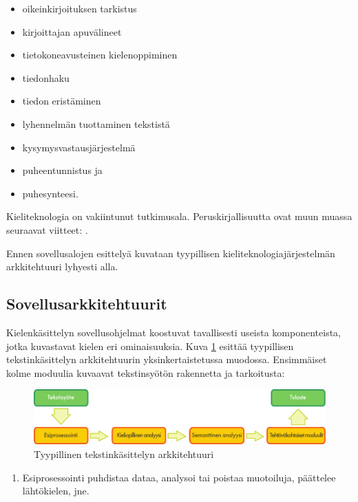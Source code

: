 \begin{multicols}{2}
\begin{itemize}
\item oikeinkirjoituksen tarkistus
\item kirjoittajan apuvälineet
\item tietokoneavusteinen kielenoppiminen
\item tiedonhaku
\item tiedon eristäminen
\item lyhennelmän tuottaminen tekstistä
\item kysymysvastausjärjestelmä
\item puheentunnistus ja
\item puhesynteesi.
\end{itemize}

Kieliteknologia on vakiintunut tutkimusala. Peruskirjallisuutta ovat muun muassa seuraavat viitteet: \cite{carstensen-etal1, jurafsky-martin01, manning-schuetze1, lt-world1, lt-survey1}.

Ennen sovellusalojen esittelyä kuvataan tyypillisen kieliteknologiajärjestelmän arkkitehtuuri lyhyesti alla.

\subsection{Sovellusarkkitehtuurit}

Kielenkäsittelyn sovellusohjelmat koostuvat tavallisesti useista komponenteista, jotka kuvastavat kielen eri ominaisuuksia. Kuva \ref{fig:textprocessingarch-fin} esittää tyypillisen tekstinkäsittelyn arkkitehtuurin yksinkertaistetussa muodossa. Ensimmäiset kolme moduulia kuvaavat tekstinsyötön rakennetta ja tarkoitusta:

\begin{figure}[b]
  \center
  \includegraphics[width=\textwidth]{../_media/finnish/text_processing_app_architecture}
  \caption{Tyypillinen tekstinkäsittelyn arkkitehtuuri}
  \label{fig:textprocessingarch-fin}
\end{figure}

\begin{enumerate}
\item Esiprosessointi puhdistaa dataa, analysoi tai poistaa muotoiluja,
 päättelee lähtökielen, jne.


\end{enumerate}
\end{multicols}
